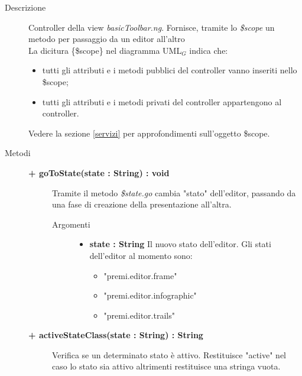 \begin{description}
\item[Descrizione] \hfill
	Controller della view \textit{basicToolbar.ng}. Fornisce, tramite lo \textit{\$scope} un metodo per passaggio da un editor all'altro
	\\ La dicitura \{\$scope\} nel diagramma UML$_G$ indica che:
\begin{itemize}
\item tutti gli attributi e i metodi pubblici del controller vanno inseriti nello \$scope;
\item tutti gli attributi e i metodi privati del controller appartengono al controller.
\end{itemize}
Vedere la sezione \ref{servizi} per approfondimenti sull'oggetto \$scope.
	
\item[Metodi] \hfill

	\begin{description}
		\item[\textbf{\color{blue}+ goToState(state : String) : void			}] \hfill
			Tramite il metodo \textit{\$state.go} cambia "stato" dell'editor, passando da una fase di creazione della presentazione all'altra.
			
		\begin{description}
			\item[Argomenti] \hfill
				\begin{itemize}
				
					\item \textbf{state : String			} \hfill
					Il nuovo stato dell'editor. Gli stati dell'editor al momento sono:
					\begin{itemize}
						\item "premi.editor.frame"
						\item "premi.editor.infographic"
						\item "premi.editor.trails"
					\end{itemize}
					
				\end{itemize}
		\end{description}
	\end{description}
	
	\begin{description}
		\item[\textbf{\color{blue}+ activeStateClass(state : String) : String			}] \hfill
			Verifica se un determinato stato è attivo. Restituisce "active" nel caso lo stato sia attivo altrimenti restituisce una stringa vuota.
			

\end{description}
\end{description}
